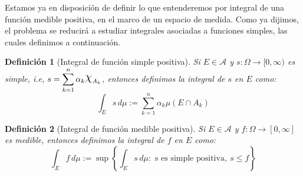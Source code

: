 \documentclass[11pt, a4paper]{article}
\DeclareRobustCommand{\rchi}{{\Large \mathpalette\irchi\relax}}
\newcommand{\irchi}[2]{\raisebox{0.6\depth}{$#1\chi$}} %
\theoremstyle{theorem-style}
\theoremstyle{definition-style}
\newtheorem{ndef}{Definición}[section]
\theoremstyle{remark-style}
\theoremstyle{example-style}
\begin{document}

Estamos ya en disposición de definir lo que entenderemos por integral de una función medible positiva, en el marco de un espacio de medida. Como ya dijimos, el problema se reducirá a estudiar integrales asociadas a funciones simples, las cuales definimos a continuación.

\begin{ndef}[Integral de función simple positiva]
  Si $E \in \mathcal{A}$ y $s:\Omega \to [0,\infty)$ es simple, i.e, $\displaystyle s= \sum_{k=1}^n \alpha_k \rchi_{A_k}$, entonces definimos la integral de $s$ en $E$ como: 
  \[
    \int_E s\, d\mu := \sum_{k=1}^n \alpha_k \mu(E\cap A_k)
  \]
\end{ndef}


\begin{ndef}[Integral de función medible positiva]
  Si $E\in \mathcal{A}$ y $f: \Omega \to [0,\infty]$ es medible, entonces definimos la integral de $f$ en $E$ como:
  \[
    \int_E f\, d\mu := \sup\left\{\int_E s\, d\mu: \text{ s es simple positiva}, \ s \leq f\right\}
  \]
\end{ndef}

\end{document}
